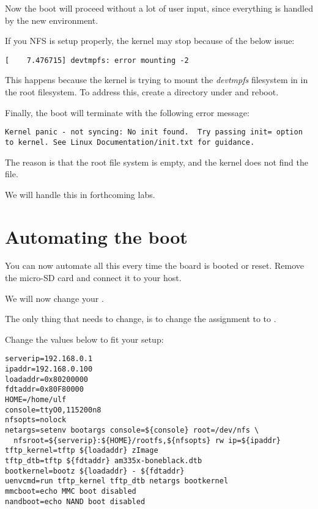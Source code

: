 Now the boot will proceed without a lot of user input, since everything is
handled by the new environment.

If you NFS is setup properly, the kernel may stop because of the below issue:

\begin{verbatim}
[    7.476715] devtmpfs: error mounting -2
\end{verbatim}

This happens because the kernel is trying to mount the {\em devtmpfs}
filesystem in  in the root filesystem. To address this,
create a  directory under  and reboot.

Finally, the boot will terminate with the following error message:

\begin{verbatim}
Kernel panic - not syncing: No init found.  Try passing init= option to kernel. See Linux Documentation/init.txt for guidance. 
\end{verbatim}

The reason is that the root file system is empty, and the kernel does not find the  file.

We will handle this in forthcoming labs.
\clearpage
\section{Automating the boot}

You can now automate all this every time the board is booted or
reset. Remove the micro-SD card and connect it to your host.

We will now change your .

The only thing that needs to change, is to change
the assignment to  to .

Change the values below to fit your setup:

\begin{verbatim}
serverip=192.168.0.1
ipaddr=192.168.0.100
loadaddr=0x80200000
fdtaddr=0x80F80000
HOME=/home/ulf
console=ttyO0,115200n8
nfsopts=nolock
netargs=setenv bootargs console=${console} root=/dev/nfs \
  nfsroot=${serverip}:${HOME}/rootfs,${nfsopts} rw ip=${ipaddr}
tftp_kernel=tftp ${loadaddr} zImage
tftp_dtb=tftp ${fdtaddr} am335x-boneblack.dtb
bootkernel=bootz ${loadaddr} - ${fdtaddr}
uenvcmd=run tftp_kernel tftp_dtb netargs bootkernel
mmcboot=echo MMC boot disabled
nandboot=echo NAND boot disabled
\end{verbatim}

